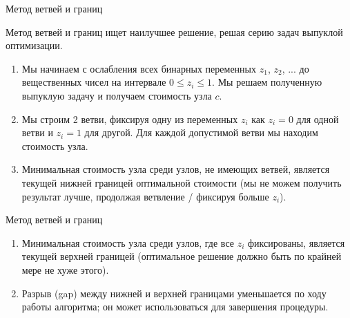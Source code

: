 \documentclass{beamer}
\begin{document}
	
	
	
	
	\begin{frame}{Метод ветвей и границ}
		\begin{flushleft}
			
			Метод ветвей и границ ищет наилучшее решение, решая серию задач выпуклой оптимизации.
			
			{\small
				\begin{enumerate}
					\item Мы начинаем с ослабления всех бинарных переменных $z_1$, $z_2$, ... до вещественных чисел на интервале $0 \leq z_i \leq 1$. Мы решаем полученную выпуклую задачу и получаем стоимость узла $c$.
					
					\item Мы строим 2 ветви, фиксируя одну из переменных $z_i$ как $z_i = 0$ для одной ветви и $z_i = 1$ для другой. Для каждой допустимой ветви мы находим стоимость узла.
					
					\item Минимальная стоимость узла среди узлов, не имеющих ветвей, является текущей нижней границей оптимальной стоимости (мы не можем получить результат лучше, продолжая ветвление / фиксируя больше $z_i$).
					
			\end{enumerate}}
			
		\end{flushleft}
	\end{frame}
	
	
	
	
	\begin{frame}{Метод ветвей и границ}
		\begin{flushleft}
			
			{\small
				\begin{enumerate}
					
					\item Минимальная стоимость узла среди узлов, где все $z_i$ фиксированы, является текущей верхней границей (оптимальное решение должно быть по крайней мере не хуже этого).
					
					\item Разрыв (gap) между нижней и верхней границами уменьшается по ходу работы алгоритма; он может использоваться для завершения процедуры.
			\end{enumerate}}
			
		\end{flushleft}
	\end{frame}
	
\end{document}
